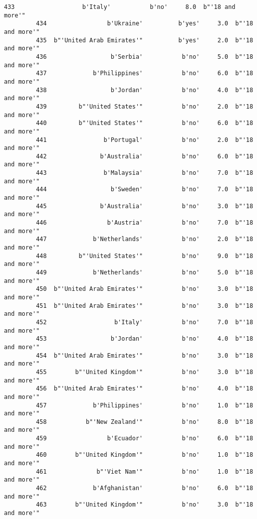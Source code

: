 \documentclass[11pt]{article}
\begin{document}
\begin{Verbatim}[commandchars=\\\{\}]
         433                   b'Italy'           b'no'     8.0  b"'18 and more'"   
         434                 b'Ukraine'          b'yes'     3.0  b"'18 and more'"   
         435  b"'United Arab Emirates'"          b'yes'     2.0  b"'18 and more'"   
         436                  b'Serbia'           b'no'     5.0  b"'18 and more'"   
         437             b'Philippines'           b'no'     6.0  b"'18 and more'"   
         438                  b'Jordan'           b'no'     4.0  b"'18 and more'"   
         439         b"'United States'"           b'no'     2.0  b"'18 and more'"   
         440         b"'United States'"           b'no'     6.0  b"'18 and more'"   
         441                b'Portugal'           b'no'     2.0  b"'18 and more'"   
         442               b'Australia'           b'no'     6.0  b"'18 and more'"   
         443                b'Malaysia'           b'no'     7.0  b"'18 and more'"   
         444                  b'Sweden'           b'no'     7.0  b"'18 and more'"   
         445               b'Australia'           b'no'     3.0  b"'18 and more'"   
         446                 b'Austria'           b'no'     7.0  b"'18 and more'"   
         447             b'Netherlands'           b'no'     2.0  b"'18 and more'"   
         448         b"'United States'"           b'no'     9.0  b"'18 and more'"   
         449             b'Netherlands'           b'no'     5.0  b"'18 and more'"   
         450  b"'United Arab Emirates'"           b'no'     3.0  b"'18 and more'"   
         451  b"'United Arab Emirates'"           b'no'     3.0  b"'18 and more'"   
         452                   b'Italy'           b'no'     7.0  b"'18 and more'"   
         453                  b'Jordan'           b'no'     4.0  b"'18 and more'"   
         454  b"'United Arab Emirates'"           b'no'     3.0  b"'18 and more'"   
         455        b"'United Kingdom'"           b'no'     3.0  b"'18 and more'"   
         456  b"'United Arab Emirates'"           b'no'     4.0  b"'18 and more'"   
         457             b'Philippines'           b'no'     1.0  b"'18 and more'"   
         458           b"'New Zealand'"           b'no'     8.0  b"'18 and more'"   
         459                 b'Ecuador'           b'no'     6.0  b"'18 and more'"   
         460        b"'United Kingdom'"           b'no'     1.0  b"'18 and more'"   
         461              b"'Viet Nam'"           b'no'     1.0  b"'18 and more'"   
         462             b'Afghanistan'           b'no'     6.0  b"'18 and more'"   
         463        b"'United Kingdom'"           b'no'     3.0  b"'18 and more'"   

\end{Verbatim}
\end{document}
